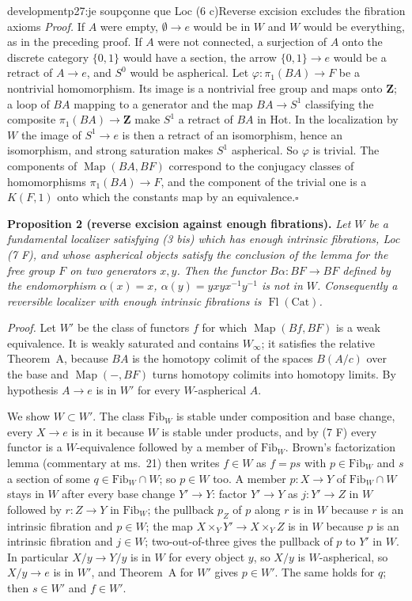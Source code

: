 \begin{dcomment}{development}{p27:je soupçonne que Loc (6 c)}{Reverse excision excludes the fibration axioms}
\textit{Proof.}
If $A$ were empty, $\emptyset\to e$ would be in $W$ and $W$ would be everything, as in the preceding proof. If $A$ were not connected, a surjection of $A$ onto the discrete category $\{0,1\}$ would have a section, the arrow $\{0,1\}\to e$ would be a retract of $A\to e$, and $S^0$ would be aspherical. Let $\varphi:\pi_1(BA)\to F$ be a nontrivial homomorphism. Its image is a nontrivial free group and maps onto $\mathbf Z$; a loop of $BA$ mapping to a generator and the map $BA\to S^1$ classifying the composite $\pi_1(BA)\to\mathbf Z$ make $S^1$ a retract of $BA$ in $\mathrm{Hot}$. In the localization by $W$ the image of $S^1\to e$ is then a retract of an isomorphism, hence an isomorphism, and strong saturation makes $S^1$ aspherical. So $\varphi$ is trivial. The components of $\operatorname{Map}(BA,BF)$ correspond to the conjugacy classes of homomorphisms $\pi_1(BA)\to F$, and the component of the trivial one is a $K(F,1)$ onto which the constants map by an equivalence.\hfill$\square$

\textbf{Proposition 2 (reverse excision against enough fibrations).}\ours
\textit{Let $W$ be a fundamental localizer satisfying (3 bis) which has enough intrinsic fibrations, Loc (7 F), and whose aspherical objects satisfy the conclusion of the lemma for the free group $F$ on two generators $x,y$. Then the functor $B\alpha:BF\to BF$ defined by the endomorphism $\alpha(x)=x$, $\alpha(y)=yxyx^{-1}y^{-1}$ is not in $W$. Consequently a reversible localizer with enough intrinsic fibrations is $\operatorname{Fl}(\mathrm{Cat})$.}

\textit{Proof.}
Let $W'$ be the class of functors $f$ for which $\operatorname{Map}(Bf,BF)$ is a weak equivalence. It is weakly saturated and contains $W_\infty$; it satisfies the relative Theorem~A, because $BA$ is the homotopy colimit of the spaces $B(A/c)$ over the base and $\operatorname{Map}(-,BF)$ turns homotopy colimits into homotopy limits. By hypothesis $A\to e$ is in $W'$ for every $W$-aspherical $A$.

We show $W\subset W'$. The class $\mathrm{Fib}_W$ is stable under composition and base change, every $X\to e$ is in it because $W$ is stable under products, and by (7 F) every functor is a $W$-equivalence followed by a member of $\mathrm{Fib}_W$. Brown's factorization lemma (commentary at ms.~21) then writes $f\in W$ as $f=ps$ with $p\in\mathrm{Fib}_W$ and $s$ a section of some $q\in\mathrm{Fib}_W\cap W$; so $p\in W$ too. A member $p:X\to Y$ of $\mathrm{Fib}_W\cap W$ stays in $W$ after every base change $Y'\to Y$: factor $Y'\to Y$ as $j:Y'\to Z$ in $W$ followed by $r:Z\to Y$ in $\mathrm{Fib}_W$; the pullback $p_Z$ of $p$ along $r$ is in $W$ because $r$ is an intrinsic fibration and $p\in W$; the map $X\times_YY'\to X\times_YZ$ is in $W$ because $p$ is an intrinsic fibration and $j\in W$; two-out-of-three gives the pullback of $p$ to $Y'$ in $W$. In particular $X/y\to Y/y$ is in $W$ for every object $y$, so $X/y$ is $W$-aspherical, so $X/y\to e$ is in $W'$, and Theorem~A for $W'$ gives $p\in W'$. The same holds for $q$; then $s\in W'$ and $f\in W'$.


\end{dcomment}

